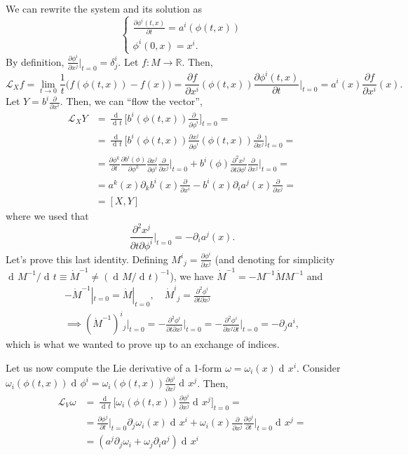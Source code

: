 \documentclass[a4paper,12pt]{book}
\newcommand{\dd}{\mathop{\mathrm{d}\!}{}}
\theoremstyle{definition}
\theoremstyle{remark}
\begin{document}
We can rewrite the system and its solution as
\[\begin{cases}
\frac{\partial \phi^i(t,x)}{\partial t}=a^i(\phi(t,x))\\
\phi^i(0,x)=x^i.
\end{cases}\]
By definition, $\frac{\partial \phi^i}{\partial x^j}\big|_{t=0}=\delta^i_j$. Let $f\colon M\to\mathbb R$. Then,
\[\mathcal L_Xf=\lim_{t\to 0}\frac1t\bigl(f(\phi(t,x))-f(x)\bigr)=\frac{\partial f}{\partial x^i}(\phi(t,x))\frac{\partial\phi^i(t,x)}{\partial t}\bigg|_{t=0}=a^i(x)\frac{\partial f}{\partial x^i}(x).\]
Let $Y=b^i\frac{\partial}{\partial x^i}$. Then, we can ``flow the vector'',
\begin{align*}
\mathcal L_XY&=\frac{\dd}{\dd t}\biggl[b^i(\phi(t,x))\frac{\partial}{\partial \phi^i}\biggr]_{t=0}=\\
&=\frac{\dd}{\dd t}\biggl[b^i(\phi(t,x))\frac{\partial x^j}{\partial \phi^i}(\phi(t,x))\frac{\partial}{\partial x^j}\biggr]_{t=0}=\\
&=\frac{\partial\phi^k}{\partial t}\frac{\partial b^i(\phi)}{\partial \phi^k}\frac{\partial x^j}{\partial \phi^i}\frac{\partial}{\partial x^j}\bigg|_{t=0}+b^i(\phi)\frac{\partial^2x^j}{\partial t\partial \phi^i}\frac{\partial}{\partial x^j}\bigg|_{t=0}=\\
&=a^k(x)\partial_kb^i(x)\frac{\partial}{\partial x^i}-b^i(x)\partial_ia^j(x)\frac{\partial}{\partial x^j}=\\
&=[X,Y]\end{align*}
where we used that
\[\frac{\partial^2x^j}{\partial t\partial \phi^i}\bigg|_{t=0}=-\partial_ia^j(x).\]
Let's prove this last identity. Defining $M^i{}_j=\frac{\partial\phi^i}{\partial x^j}$ (and denoting for simplicity $\dd M^{-1}/\dd t\equiv\dot M^{-1}\ne (\dd M/\dd t)^{-1}$), we have $\dot M^{-1}=-M^{-1}\dot M M^{-1}$ and
\begin{gather*}-\dot M^{-1}|_{t=0}=\dot M|_{t=0},\quad\dot M^i{}_j=\frac{\partial^2\phi^i}{\partial t\partial x^j}\\
\implies (\dot M^{-1})^i{}_j\big|_{t=0}=-\frac{\partial^2\phi^i}{\partial t\partial x^j}\bigg|_{t=0}=-\frac{\partial^2\phi^i}{\partial x^j\partial t}\bigg|_{t=0}=-\partial_ja^i,\end{gather*}
which is what we wanted to prove up to an exchange of indices.

Let us now compute the Lie derivative of a 1-form $\omega=\omega_i(x)\dd x^i$. Consider $\omega_i(\phi(t,x))\dd \phi^i=\omega_i(\phi(t,x))\frac{\partial\phi^i}{\partial x^j}\dd x^j$. Then,
\begin{align*}
\mathcal L_V\omega&=\frac{\dd}{\dd t}\biggl[\omega_i(\phi(t,x))\frac{\partial\phi^i}{\partial x^j}\dd x^j\biggr]_{t=0}=\\
&=\frac{\partial\phi^j}{\partial t}\bigg|_{t=0}\partial_j\omega_i(x)\dd x^i+\omega_i(x)\frac{\partial}{\partial x^j}\frac{\partial\phi^i}{\partial t}\bigg|_{t=0}\dd x^j=\\
&=(a^j\partial_j\omega_i+\omega_j\partial_ia^j)\dd x^i
\end{align*}
\end{document}
